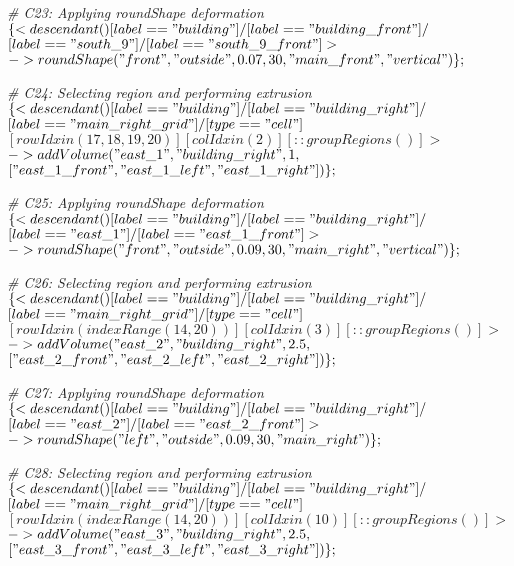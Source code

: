 \noindent \textit{\# C23: Applying roundShape deformation}\\
$\{< descendant() [label=="building"] / [label=="building\_front"] / $\\
$[label=="south\_9"] / [label=="south\_9\_front"] > $\\
$-> roundShape("front", "outside", 0.07, 30, "main\_front", "vertical")\};$

\noindent \textit{\# C24: Selecting region and performing extrusion}\\
$\{< descendant() [label=="building"] / [label=="building\_right"] / $\\
$[label=="main\_right\_grid"] / [type=="cell"] $\\
$[rowIdx in (17, 18, 19, 20)] [colIdx in (2)] [::groupRegions()] > $\\
$-> addVolume("east\_1", "building\_right", 1, $\\
$["east\_1\_front", "east\_1\_left", "east\_1\_right"])\};$

\noindent \textit{\# C25: Applying roundShape deformation}\\
$\{< descendant() [label=="building"] / [label=="building\_right"] / $\\
$[label=="east\_1"] / [label=="east\_1\_front"] > $\\
$-> roundShape("front", "outside", 0.09, 30, "main\_right", "vertical")\};$

\noindent \textit{\# C26: Selecting region and performing extrusion}\\
$\{< descendant() [label=="building"] / [label=="building\_right"] / $\\
$[label=="main\_right\_grid"] / [type=="cell"] $\\
$[rowIdx in (indexRange(14, 20))] [colIdx in (3)] [::groupRegions()] > $\\
$-> addVolume("east\_2", "building\_right", 2.5, $\\
$["east\_2\_front", "east\_2\_left", "east\_2\_right"])\};$

\noindent \textit{\# C27: Applying roundShape deformation}\\
$\{< descendant() [label=="building"] / [label=="building\_right"] / $\\
$[label=="east\_2"] / [label=="east\_2\_front"] > $\\
$-> roundShape("left", "outside", 0.09, 30, "main\_right")\};$

\noindent \textit{\# C28: Selecting region and performing extrusion}\\
$\{< descendant() [label=="building"] / [label=="building\_right"] / $\\
$[label=="main\_right\_grid"] / [type=="cell"] $\\
$[rowIdx in (indexRange(14, 20))] [colIdx in (10)] [::groupRegions()] > $\\
$-> addVolume("east\_3", "building\_right", 2.5, $\\
$["east\_3\_front", "east\_3\_left", "east\_3\_right"])\};$


